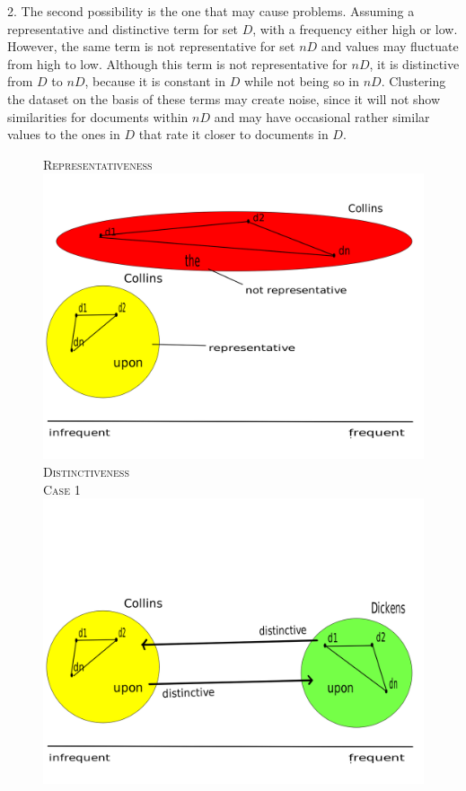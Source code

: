 \documentclass[a4paper,10pt,twoside,fleqn]{article}
\begin{document}
2. The second possibility is the one that may cause problems. Assuming a representative and distinctive term for set $D$, with a frequency either high or low. 
However, the same term is not representative for set $nD$ and values may fluctuate from high to low. Although this term is not representative for $nD$, it
is distinctive from $D$ to $nD$, because it is constant in $D$ while not being so in $nD$. 
Clustering the dataset on the basis of these terms may create noise, since it will not show similarities for documents within $nD$ and 
may have occasional rather similar values to the ones in $D$ that rate it closer to documents in $D$.

\begin{figure}[!htb]
\sf \textsc{Representativeness}
  \includegraphics[scale=0.2,width=\linewidth]{figures/repres1-fin.png}
  \endminipage\hfill
{}
\sf \textsc{Distinctiveness} \\
{\scriptsize \textsc{Case 1}}\\
  \includegraphics[scale=0.2,width=\linewidth]{figures/distinc1-fin.png}

\end{figure}
\end{document}
